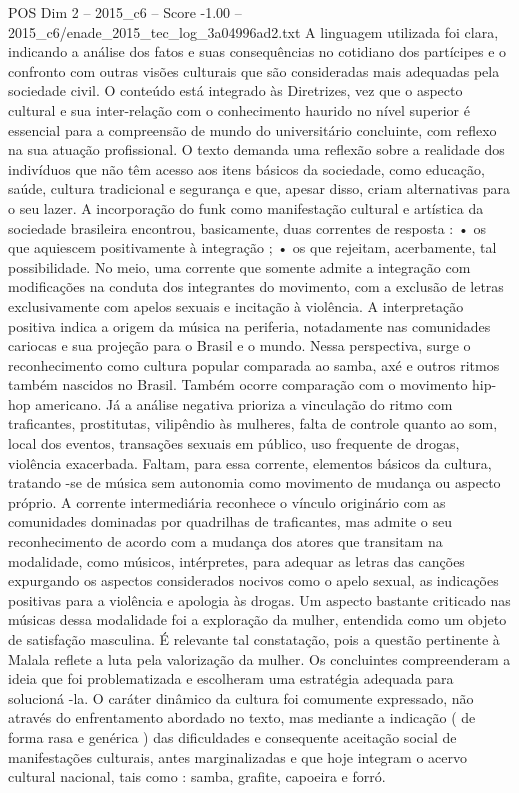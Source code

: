 \begin{textsample}{POS Dim 2 – 2015\_c6 – Score -1.00 – 2015\_c6/enade\_2015\_tec\_log\_3a04996ad2.txt}
A linguagem utilizada foi clara, indicando a análise dos fatos e suas consequências no cotidiano dos partícipes e o confronto com outras visões culturais que são consideradas mais adequadas pela sociedade civil.
O conteúdo está integrado às Diretrizes, vez que o aspecto cultural e sua inter-relação com o conhecimento haurido no nível superior é essencial para a compreensão de mundo do universitário concluinte, com reflexo na sua atuação profissional.
O texto demanda uma reflexão sobre a realidade dos indivíduos que não têm acesso aos itens básicos da sociedade, como educação, saúde, cultura tradicional e segurança e que, apesar disso, criam alternativas para o seu lazer.
A incorporação do funk como manifestação cultural e artística da sociedade brasileira encontrou, basicamente, duas correntes de resposta : • os que aquiescem positivamente à integração ; • os que rejeitam, acerbamente, tal possibilidade.
No meio, uma corrente que somente admite a integração com modificações na conduta dos integrantes do movimento, com a exclusão de letras exclusivamente com apelos sexuais e incitação à violência.
A interpretação positiva indica a origem da música na periferia, notadamente nas comunidades cariocas e sua projeção para o Brasil e o mundo.
Nessa perspectiva, surge o reconhecimento como cultura popular comparada ao samba, axé e outros ritmos também nascidos no Brasil.
Também ocorre comparação com o movimento hip-hop americano.
Já a análise negativa prioriza a vinculação do ritmo com traficantes, prostitutas, vilipêndio às mulheres, falta de controle quanto ao som, local dos eventos, transações sexuais em público, uso frequente de drogas, violência exacerbada.
Faltam, para essa corrente, elementos básicos da cultura, tratando -se de música sem autonomia como movimento de mudança ou aspecto próprio.
A corrente intermediária reconhece o vínculo originário com as comunidades dominadas por quadrilhas de traficantes, mas admite o seu reconhecimento de acordo com a mudança dos atores que transitam na modalidade, como músicos, intérpretes, para adequar as letras das canções expurgando os aspectos considerados nocivos como o apelo sexual, as indicações positivas para a violência e apologia às drogas.
Um aspecto bastante criticado nas músicas dessa modalidade foi a exploração da mulher, entendida como um objeto de satisfação masculina.
É relevante tal constatação, pois a questão pertinente à Malala reflete a luta pela valorização da mulher.
Os concluintes compreenderam a ideia que foi problematizada e escolheram uma estratégia adequada para solucioná -la.
O caráter dinâmico da cultura foi comumente expressado, não através do enfrentamento abordado no texto, mas mediante a indicação ( de forma rasa e genérica ) das dificuldades e consequente aceitação social de manifestações culturais, antes marginalizadas e que hoje integram o acervo cultural nacional, tais como : samba, grafite, capoeira e forró.

\end{textsample}
